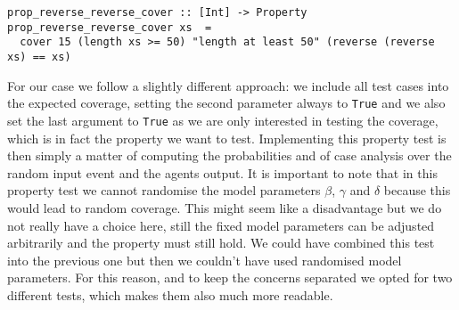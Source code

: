 \begin{footnotesize}
\begin{verbatim}
prop_reverse_reverse_cover :: [Int] -> Property
prop_reverse_reverse_cover xs  =  
  cover 15 (length xs >= 50) "length at least 50" (reverse (reverse xs) == xs)
\end{verbatim}
\end{footnotesize}

%

For our case we follow a slightly different approach: we include all test cases into the expected coverage, setting the second parameter always to \texttt{True} and we also set the last argument to \texttt{True} as we are only interested in testing the coverage, which is in fact the property we want to test. Implementing this property test is then simply a matter of computing the probabilities and of case analysis over the random input event and the agents output. It is important to note that in this property test we cannot randomise the model parameters $\beta$, $\gamma$ and $\delta$ because this would lead to random coverage. This might seem like a disadvantage but we do not really have a choice here, still the fixed model parameters can be adjusted arbitrarily and the property must still hold. We could have combined this test into the previous one but then we couldn't have used randomised model parameters. For this reason, and to keep the concerns separated we opted for two different tests, which makes them also much more readable. 

